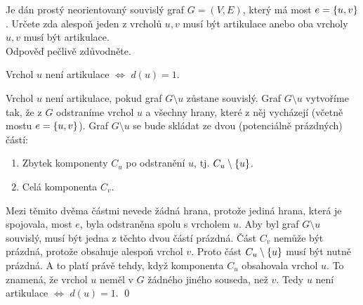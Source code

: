\documentclass[11pt,a4paper]{article}
\begin{document}
\title{}
\author{Jakub Adamec\\XP01TGR}

\maketitle

\begin{exercise}
Je dán prostý neorientovaný souvislý graf $G = (V,E)$, který má most $e = \left\lbrace u,v \right\rbrace$. Určete zda alespoň jeden z vrcholů
$u,v$ musí být artikulace anebo oba vrcholy $u,v$ musí být artikulace.\\
Odpověď pečlivě zdůvodněte.
\end{exercise}
\begin{solution}
    \begin{lemma}
        Vrchol $u$ není artikulace $\iff$ $d(u)=1$.
    \end{lemma}
    \begin{prof}
        Vrchol $u$ není artikulace, pokud graf $G \setminus u$ zůstane souvislý. Graf $G \setminus u$ vytvoříme tak, že z 
        $G$ odstraníme vrchol $u$ a všechny hrany, které z něj vycházejí (včetně mostu $e = \left\lbrace u,v \right\rbrace$). Graf $G \setminus u$ se 
        bude skládat ze dvou (potenciálně prázdných) částí:
        \vspace{-1em}
        \begin{enumerate}[1), noitemsep]
            \item Zbytek komponenty $C_u$ po odstranění $u$, tj. $C_u \setminus \left\lbrace u \right\rbrace$.
            \item Celá komponenta $C_v$.
        \end{enumerate}
        \vspace{-1em}
        Mezi těmito dvěma částmi nevede žádná hrana, protože jediná hrana, která je spojovala, most $e$, byla odstraněna spolu s 
        vrcholem $u$. Aby byl graf $G \setminus u$ souvislý, musí být jedna z těchto dvou částí prázdná.  Část $C_v$ nemůže být 
        prázdná, protože obsahuje alespoň vrchol $v$. Proto část $C_u \setminus \left\lbrace u \right\rbrace$ musí být nutně prázdná. A to platí právě 
        tehdy, když komponenta $C_u$ obsahovala  vrchol $u$. To znamená, že vrchol $u$ neměl v $G$ žádného jiného 
        souseda, než $v$. Tedy $u$ není artikulace $\iff$ $d(u)=1$. 
        \hspace{\fill}\qed 
    \end{prof}

\end{solution}
\end{document}
